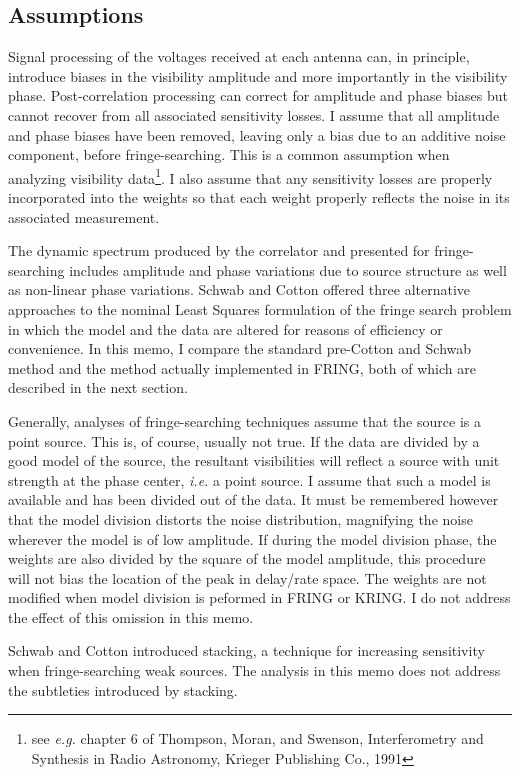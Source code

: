 \subsection{Assumptions}

Signal processing of the voltages received at each antenna can, in
principle, introduce biases in the visibility amplitude and more
importantly in the visibility phase.  Post-correlation processing can
correct for amplitude and phase biases but cannot recover from all
associated sensitivity losses.  I assume that all amplitude and phase
biases have been removed, leaving only a bias due to an additive noise
component, before fringe-searching.  This is a common assumption when
analyzing visibility data\footnote{ see {\it e.g.\/} chapter 6 of
Thompson, Moran, and Swenson, Interferometry and Synthesis in Radio
Astronomy, Krieger Publishing Co., 1991}.  I also assume that any
sensitivity losses are properly incorporated into the weights so that
each weight properly reflects the noise in its associated measurement.

The dynamic spectrum produced by the correlator and presented for
fringe-searching includes amplitude and phase variations due to source
structure as well as non-linear phase variations.  Schwab and Cotton
offered three alternative approaches to the nominal Least Squares
formulation of the fringe search problem in which the model and the
data are altered for reasons of efficiency or convenience.  In this
memo, I compare the standard pre-Cotton and Schwab method and the
method actually implemented in FRING, both of which are described in
the next section.

Generally, analyses of fringe-searching techniques assume that the
source is a point source.  This is, of course, usually not true.  If
the data are divided by a good model of the source, the resultant
visibilities will reflect a source with unit strength at the phase
center, {\it i.e.} a point source.  I assume that such a model is
available and has been divided out of the data.  It must be remembered
however that the model division distorts the noise distribution,
magnifying the noise wherever the model is of low amplitude.  If during the
model division phase, the weights are also divided by the square of the
model amplitude, this procedure will not bias the location of the peak in
delay/rate space.  The weights are not
modified when model division is peformed in FRING or KRING.  I do not
address the effect of this omission in this memo.

Schwab and Cotton introduced stacking, a technique for increasing
sensitivity when fringe-searching weak sources.  The analysis in this
memo does not address the subtleties introduced by stacking.

